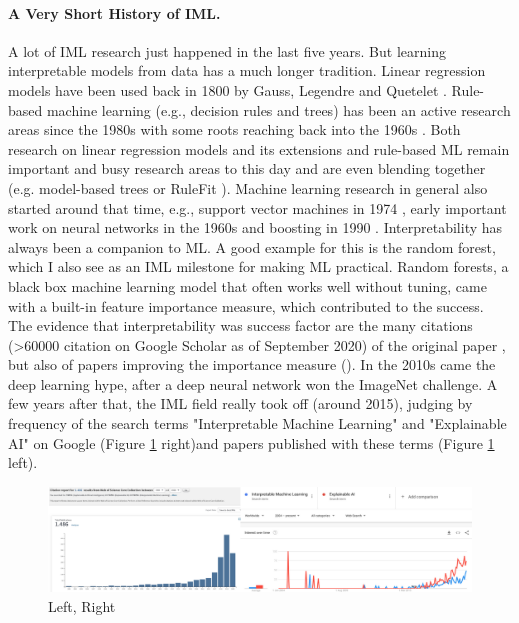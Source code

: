 \documentclass[runningheads]{llncs}
\begin{document}
\paragraph{A Very Short History of IML.}
A lot of IML research just happened in the last five years.
But learning interpretable models from data has a much longer tradition.
Linear regression models have been used back in 1800 by Gauss, Legendre and Quetelet \cite{stigler1986history,legendre1805nouvelles,gauss1809theoria,quetelet1827recherches}.
Rule-based machine learning (e.g., decision rules and trees) has been an active research areas since the 1980s \cite{furnkranz2012foundations} with some roots reaching back into the 1960s \cite{hajek1966guha}.
Both research on linear regression models and its extensions and rule-based ML remain important and busy research areas to this day and are even blending together (e.g. model-based trees \cite{zeileis2008model} or RuleFit \cite{friedman2008predictive}).
Machine learning research in general also started around that time, e.g., support vector machines in 1974 \cite{vapnik1974theory}, early important work on neural networks in the 1960s and boosting in 1990 \cite{schapire1990strength}.
Interpretability has always been a companion to ML.
A good example for this is the random forest, which I also see as an IML milestone for making ML practical.
Random forests, a black box machine learning model that often works well without tuning, came with a built-in feature importance measure, which contributed to the success.
The evidence that interpretability was success factor are the many citations (>60000 citation on Google Scholar as of September 2020) of the original paper \cite{breiman2001random}, but also of papers improving the importance measure (\cite{strobl2008conditional,strobl2007bias,hapfelmeier2014new,ishwaran2007variable}).
In the 2010s came the deep learning hype, after a deep neural network won the ImageNet challenge.
A few years after that, the IML field really took off (around 2015), judging by frequency of the search terms "Interpretable Machine Learning" and "Explainable AI" on Google (Figure \ref{fig:count} right)and papers published with these terms (Figure \ref{fig:count} left).
\begin{figure}
  \includegraphics[width=\textwidth]{citation-search.png}
  \caption{Left, Right}
  \label{fig:count}
\end{figure}
\end{document}
